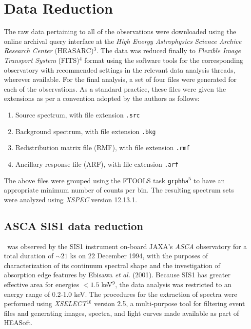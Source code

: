 \section{Data Reduction} \label{sec:reduction-analysis}
    The raw data pertaining to all of the observations were downloaded using the online archival query interface at the \textit{High Energy Astrophysics Science Archive Research Center} (HEASARC)$^3$. The data was reduced finally to \textit{Flexible Image Transport System} (FITS)$^4$ format using the software tools for the corresponding observatory with recommended settings in the relevant data analysis threads, wherever available. For the final analysis, a set of four files were generated for each of the observations. As a standard practice, these files were given the extensions as per a convention adopted by the authors as follows:
    \begin{enumerate}
    	\item Source spectrum, with file extension \texttt{.src}
    	\item Background spectrum, with file extension \texttt{.bkg}
    	\item Redistribution matrix file (RMF), with file extension \texttt{.rmf}
    	\item Ancillary response file (ARF), with file extension \texttt{.arf}
    \end{enumerate}
    The above files were grouped using the FTOOLS task \texttt{grphha}$^{5}$ to have an appropriate minimum number of counts per bin. The resulting spectrum sets were analyzed using \textit{XSPEC} version 12.13.1.
    
    \subsection{ASCA SIS1 data reduction}
    	\source\ was observed by the SIS1 instrument on-board JAXA's \textit{ASCA} observatory for a total duration of $\sim 21$ ks on 22 December 1994, with the purposes of characterization of its continuum spectral shape and the investigation of absorption edge features by Ebisawa \textit{et al.} (2001). %
    	Because SIS1 has greater effective area for energies $<1.5$ keV$^9$, the data analysis was restricted to an energy range of 0.2-1.0 keV. The procedures for the extraction of spectra were performed using \textit{XSELECT}$^{10}$ version 2.5, a multi-purpose tool for filtering event files and generating images, spectra, and light curves made available as part of HEASoft.
    	
